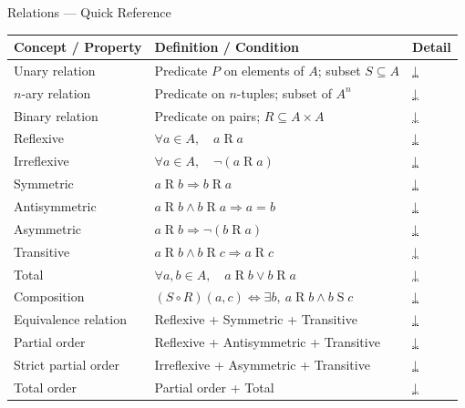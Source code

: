 \begin{toolkitbox}{Relations — Quick Reference}
\small
\begin{tabular}{l l l}
\toprule
\textbf{Concept / Property} & \textbf{Definition / Condition} & \textbf{Detail} \\
\midrule
Unary relation     & Predicate $P$ on elements of $A$; subset $S \subseteq A$            & \hyperref[def:unary-relation]{↓} \\
$n$-ary relation   & Predicate on $n$-tuples; subset of $A^n$                            & \hyperref[def:nary-relation]{↓} \\
Binary relation    & Predicate on pairs; $R \subseteq A \times A$                        & \hyperref[def:binary-relation]{↓} \\
\midrule
Reflexive      & $\forall a \in A,\quad a \mathrel{R} a$                                  & \hyperref[def:rel-reflexive]{↓} \\
Irreflexive    & $\forall a \in A,\quad \lnot(a \mathrel{R} a)$                           & \hyperref[def:rel-irreflexive]{↓} \\
Symmetric      & $a \mathrel{R} b \Rightarrow b \mathrel{R} a$                             & \hyperref[def:rel-symmetric]{↓} \\
Antisymmetric  & $a \mathrel{R} b \land b \mathrel{R} a \Rightarrow a = b$                 & \hyperref[def:rel-antisymmetric]{↓} \\
Asymmetric     & $a \mathrel{R} b \Rightarrow \lnot(b \mathrel{R} a)$                      & \hyperref[def:rel-asymmetric]{↓} \\
Transitive     & $a \mathrel{R} b \land b \mathrel{R} c \Rightarrow a \mathrel{R} c$       & \hyperref[def:rel-transitive]{↓} \\
Total          & $\forall a,b \in A,\quad a \mathrel{R} b \lor b \mathrel{R} a$            & \hyperref[def:rel-total]{↓} \\
\midrule
Composition    & $(S \circ R)(a,c) \iff \exists b,\ a\mathrel{R}b \land b\mathrel{S}c$    & \hyperref[def:rel-composition]{↓} \\
\midrule
Equivalence relation & Reflexive + Symmetric + Transitive                                & \hyperref[def:equiv-relation]{↓} \\
Partial order        & Reflexive + Antisymmetric + Transitive                            & \hyperref[def:partial-order]{↓} \\
Strict partial order & Irreflexive + Asymmetric + Transitive                             & \hyperref[def:strict-partial-order]{↓} \\
Total order          & Partial order + Total                                             & \hyperref[def:total-order]{↓} \\
\bottomrule
\end{tabular}
\end{toolkitbox}


